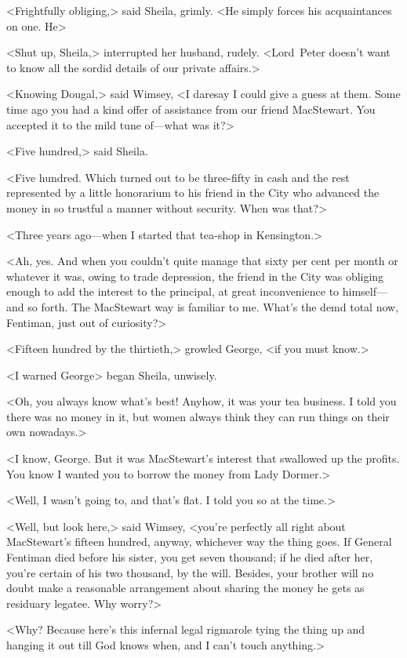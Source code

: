<Frightfully obliging,> said Sheila, grimly. <He simply forces his acquaintances on one. He\longdash>

<Shut up, Sheila,> interrupted her husband, rudely. <Lord~Peter doesn't want to know all the sordid details of our private affairs.>

<Knowing Dougal,> said Wimsey, <I daresay I could give a guess at them. Some time ago you had a kind offer of assistance from our friend MacStewart. You accepted it to the mild tune of—what was it?>

<Five hundred,> said Sheila.

<Five hundred. Which turned out to be three-fifty in cash and the rest represented by a little honorarium to his friend in the City who advanced the money in so trustful a manner without security. When was that?>

<Three years ago—when I started that tea-shop in Kensington.>

<Ah, yes. And when you couldn't quite manage that sixty per cent per month or whatever it was, owing to trade depression, the friend in the City was obliging enough to add the interest to the principal, at great inconvenience to himself—and so forth. The MacStewart way is familiar to me. What's the demd total now, Fentiman, just out of curiosity?>

<Fifteen hundred by the thirtieth,> growled George, <if you must know.>

<I warned George\longdash> began Sheila, unwisely.

<Oh, you always know what's best! Anyhow, it was your tea business. I told you there was no money in it, but women always think they can run things on their own nowadays.>

<I know, George. But it was MacStewart's interest that swallowed up the profits. You know I wanted you to borrow the money from Lady Dormer.>

<Well, I wasn't going to, and that's flat. I told you so at the time.>

<Well, but look here,> said Wimsey, <you're perfectly all right about MacStewart's fifteen hundred, anyway, whichever way the thing goes. If General Fentiman died before his sister, you get seven thousand; if he died after her, you're certain of his two thousand, by the will. Besides, your brother will no doubt make a reasonable arrangement about sharing the money he gets as residuary legatee. Why worry?>

<Why? Because here's this infernal legal rigmarole tying the thing up and hanging it out till God knows when, and I can't touch anything.>

